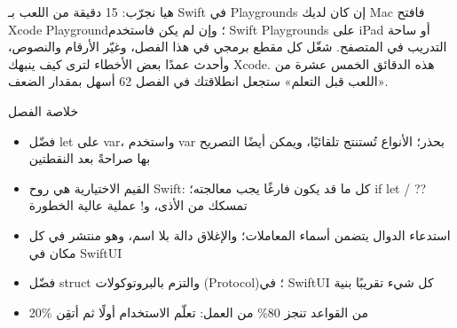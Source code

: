 \begin{tcbpractice}{هيا نجرّب: 15 دقيقة من اللعب بـ Swift في Playgrounds}
إن كان لديك Mac فافتح Xcode Playground؛ وإن لم يكن فاستخدم Swift Playgrounds على iPad أو ساحة التدريب في المتصفح. شغّل كل مقطع برمجي في هذا الفصل، وغيّر الأرقام والنصوص، وأحدث عمدًا بعض الأخطاء لترى كيف ينبهك Xcode. هذه الدقائق الخمس عشرة من «اللعب قبل التعلم» ستجعل انطلاقتك في الفصل 62 أسهل بمقدار الضعف.

\end{tcbpractice}

\begin{tcbsummary}{خلاصة الفصل}
\begin{itemize}
  \item فضّل let على var، واستخدم var بحذر؛ الأنواع تُستنتج تلقائيًا، ويمكن أيضًا التصريح بها صراحةً بعد النقطتين
  \item القيم الاختيارية هي روح Swift: كل ما قد يكون فارغًا يجب معالجته؛ if let / ?? تمسكك من الأذى، و! عملية عالية الخطورة
  \item استدعاء الدوال يتضمن أسماء المعاملات؛ والإغلاق دالة بلا اسم، وهو منتشر في كل مكان في SwiftUI
  \item فضّل struct والتزم بالبروتوكولات (Protocol)؛ في SwiftUI كل شيء تقريبًا بنية
  \item 20\% من القواعد تنجز 80\% من العمل: تعلّم الاستخدام أولًا ثم أتقِن
\end{itemize}

\end{tcbsummary}
